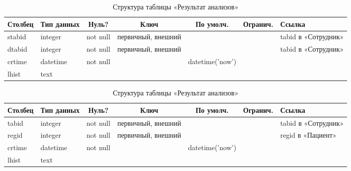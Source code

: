 \documentclass[14pt,a4paper,russian]{extreport}
\begin{document}
\begin{table}[h!]
    \caption{ } 
    \begin{subtable}[t]{\textwidth}
    \caption{Структура таблицы «Результат анализов»}
    \begin{tabularx}{\textwidth}{| X | X | c | c | c | c | X |}
        \hline
        \textbf{Столбец} & \textbf{Тип данных} & \textbf{Нуль?} & \textbf{Ключ} & \textbf{По
        умолч.} & \textbf{Огранич.} & \textbf{Ссылка} \\ \hline
        stabid & integer & not null & первичный, внешний & & & tabid в «Сотрудник» \\ \hline
        dtabid & integer & not null & первичный, внешний & & & tabid в «Сотрудник» \\ \hline
        crtime & datetime & not null & & datetime('now') &  & \\ \hline
        lhist & text & & & & & \\ \hline
    \end{tabularx}
    \end{subtable}
    \label{table:emplink}
\end{table}

\begin{table}[h!]
    \caption{ } 
    \begin{subtable}[t]{\textwidth}
    \caption{Структура таблицы «Результат анализов»}
    \begin{tabularx}{\textwidth}{| X | X | c | c | c | c | X |}
        \hline
        \textbf{Столбец} & \textbf{Тип данных} & \textbf{Нуль?} & \textbf{Ключ} & \textbf{По
        умолч.} & \textbf{Огранич.} & \textbf{Ссылка} \\ \hline
        tabid & integer & not null & первичный, внешний & & & tabid в «Сотрудник» \\ \hline
        regid & integer & not null & первичный, внешний & & & regid в «Пациент» \\ \hline
        crtime & datetime & not null & & datetime('now') &  & \\ \hline
        lhist & text & & & & & \\ \hline
    \end{tabularx}
    \end{subtable}
    \label{table:patlink}
\end{table}
\end{document}
